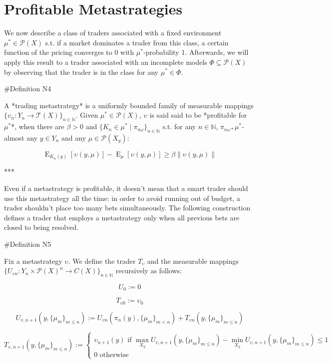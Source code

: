 \documentclass[a4paper]{article}
\DeclareMathOperator{\E}{E}
\newcommand{\Nats}{\mathbb{N}}
\newcommand{\Norm}[1]{\lVert #1 \rVert}
\newcommand{\Prob}{\mathcal{P}}
\newcommand{\T}{\mathcal{T}}
\begin{document}
\section{Profitable Metastrategies}

We now describe a class of traders associated with a fixed environment ${\mu^* \in \Prob(X)}$ s.t. if a market dominates a trader from this class, a certain function of the pricing converges to 0 with ${\mu^*}$-probability 1. Afterwards, we will apply this result to a trader associated with an incomplete models ${\Phi \subseteq \Prob(X)}$ by observing that the trader is in the class for any ${\mu^* \in \Phi}$.

\#Definition N4

A *trading metastrategy* is a uniformly bounded family of measurable mappings ${\{\upsilon_n: Y_n \rightarrow \T(X)\}_{n \in \Nats}}$. Given ${\mu^* \in \Prob(X)}$, ${\upsilon}$ is said said to be *profitable for ${\mu^*}$*, when there are ${\beta > 0}$ and ${\{K_n \in \mu^* \mid \pi_{n\omega}\}_{n \in \Nats}}$ s.t. for any ${n \in \Nats}$, ${\pi_{n\omega*}\mu^*}$-almost any ${y \in Y_n}$ and any ${\mu \in \Prob(X_y)}$:

$$\E_{K_n(y)}[\upsilon(y,\mu)] - \E_{\mu}[\upsilon(y,\mu)] \geq \beta \Norm{\upsilon(y,\mu)}$$

***

Even if a metastrategy is profitable, it doesn't mean that a smart trader should use this metastrategy all the time: in order to avoid running out of budget, a trader shouldn't place too many bets simultaneously. The following construction defines a trader that employs a metastrategy only when all previous bets are closed to being resolved.

\#Definition N5

Fix a metastrategy ${\upsilon}$. We define the trader ${T_\upsilon}$ and the measurable mappings ${\{U_{\upsilon  n}: Y_n \times \Prob(X)^n \rightarrow C(X)\}_{n \in \Nats}}$ recursively as follows:
 
 $$U_0 := 0$$

$$T_{\upsilon0} := \upsilon_0$$

$$U_{\upsilon,n+1}(y, \{\mu_m\}_{m \leq n}) := U_{\upsilon n}(\pi_n(y), \{\mu_m\}_{m < n}) + T_{\upsilon n}(y, \{\mu_m\}_{m \leq n})$$

$$T_{\upsilon,n+1}(y, \{\mu_m\}_{m \leq n}) := \begin{cases}\upsilon_{n+1}(y) \text{ if } \max_{X_y} U_{\upsilon,n+1}(y,\{\mu_m\}_{m \leq n}) - \min_{X_y} U_{\upsilon,n+1}(y,\{\mu_m\}_{m \leq n})\leq 1\\0 \text{ otherwise}\end{cases}$$
\end{document}
